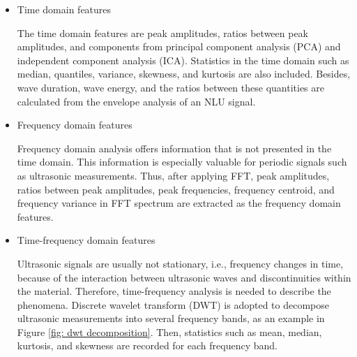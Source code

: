 \begin{itemize}
    \item Time domain features
    
    The time domain features are peak amplitudes, ratios between peak amplitudes, and components from principal component analysis (PCA) and independent component analysis (ICA). Statistics in the time domain such as median, quantiles, variance, skewness, and kurtosis are also included. Besides, wave duration, wave energy, and the ratios between these quantities are calculated from the envelope analysis of an NLU signal.

    \item Frequency domain features
    
    Frequency domain analysis offers information that is not presented in the time domain. This information is especially valuable for periodic signals such as ultrasonic measurements. Thus, after applying FFT, peak amplitudes, ratios between peak amplitudes, peak frequencies, frequency centroid, and frequency variance in FFT spectrum are extracted as the frequency domain features.

    \item Time-frequency domain features
    
    Ultrasonic signals are usually not stationary, i.e., frequency changes in time, because of the interaction between ultrasonic waves and discontinuities within the material. Therefore, time-frequency analysis is needed to describe the phenomena. Discrete wavelet transform (DWT) is adopted to decompose ultrasonic measurements into several frequency bands, as an example in Figure \ref{fig: dwt decomposition}. Then, statistics such as mean, median, kurtosis, and skewness are recorded for each frequency band.
\end{itemize}

